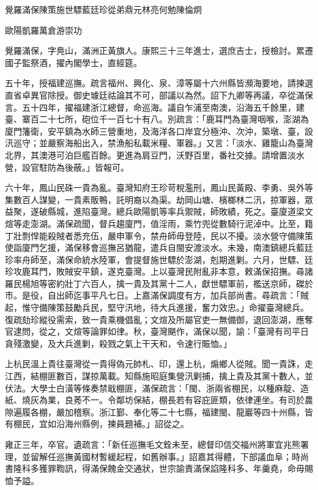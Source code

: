 
\begin{pinyinscope}
覺羅滿保陳策施世驃藍廷珍從弟鼎元林亮何勉陳倫炯

歐陽凱羅萬倉游崇功

覺羅滿保，字鳧山，滿洲正黃旗人。康熙三十三年進士，選庶吉士，授檢討。累遷國子監祭酒，擢內閣學士，直經筵。

五十年，授福建巡撫。疏言福州、興化、泉、漳等屬十六州縣皆瀕海要地，請揀選直省卓異官除授。御史璩廷祜論其不可，部議以為然。詔下九卿等再議，卒從滿保言。五十四年，擢福建浙江總督，命巡海。議自乍浦至南澳，沿海五千餘里，建臺、寨百二十七所，砲位千一百七十有八。別疏言：「鹿耳門為臺灣咽喉，澎湖為廈門籓衛，安平鎮為水師三營重地，及海洋各口岸宜分極沖、次沖，築墩、臺，設汛巡守；並嚴察海船出入，禁漁船私載米糧、軍器。」又言：「淡水、雞籠山為臺灣北界，其澳港可泊巨艦百餘。更進為肩豆門，沃野百里，番社交據。請增置淡水營，設官駐防為後蔽。」皆報可。

六十年，鳳山民硃一貴為亂。臺灣知府王珍苛稅濫刑，鳳山民黃殿、李勇、吳外等集數百人謀變，一貴素販鴨，託明裔以為渠。劫岡山塘、檳榔林二汛，掠軍器，眾益聚，遂破縣城，進陷臺灣。總兵歐陽凱等率兵禦賊，師敗績，死之。臺廈道梁文煊等走澎湖。滿保疏聞，督兵趨廈門，值淫雨，乘竹兜從數騎行泥淖中。比至，籍丁壯剽悍能殺賊者悉充伍，嚴申軍令，禁舟師毋登陸，民以不擾。淡水營守備陳策使詣廈門乞援，滿保移會巡撫呂猶龍，遣兵自閩安渡淡水。未幾，南澳鎮總兵藍廷珍率舟師至，滿保命統水陸軍，會提督施世驃於澎湖，剋期進剿。六月，世驃、廷珍攻鹿耳門，敗賊安平鎮，遂克臺灣。上以臺灣民附亂非本意，敕滿保招撫。尋諸羅民楊旭等密約壯丁六百人，擒一貴及其黨十二人，獻世驃軍前，檻送京師，磔於市。是役，自出師迄事平凡七日。上嘉滿保調度有方，加兵部尚書。尋疏言：「賊起，惟守備陳策鼓勵兵民，堅守汛地，待大兵進援，奮力效忠。」命擢臺灣總兵。復疏劾珍縱役需索，致一貴乘機倡亂；文煊及所屬官吏一無備御，退回澎湖，應奪官逮問，從之，文煊等論罪如律。秋，臺灣颶作，滿保以聞，諭：「臺灣有司平日貪殘激變，及大兵進剿，殺戮之氣上干天和，令速行賑恤。」

上杭民溫上貴往臺灣從一貴得偽元帥札、印，還上杭，煽鄉人從賊。聞一貴誅，走江西，結棚匪數百，謀掠萬載。知縣施昭庭集營汛剿捕，擒上貴及其黨十數人，並伏法。大學士白潢等條奏禁戢棚匪，滿保疏言：「閩、浙兩省棚民，以種麻靛、造紙、燒灰為業，良莠不一。令鄰坊保結，棚長若有容庇匪類，依律連坐。有司於農隙遍履各棚，嚴加稽察。浙江鄞、奉化等二十七縣，福建閩、龍巖等四十州縣，皆有棚民，宜如沿海州縣例，揀員題補。」詔從之。

雍正三年，卒官。遺疏言：「新任巡撫毛文銓未至，總督印信交福州將軍宜兆熊署理，並留解任巡撫黃國材暫緩起程，如舊辦事。」詔嘉其得體，下部議血阜；時尚書隆科多獲罪鞫訊，得滿保餽金交通狀，世宗諭責滿保諂隆科多、年羹堯，命毋賜恤予謚。


\end{pinyinscope}
